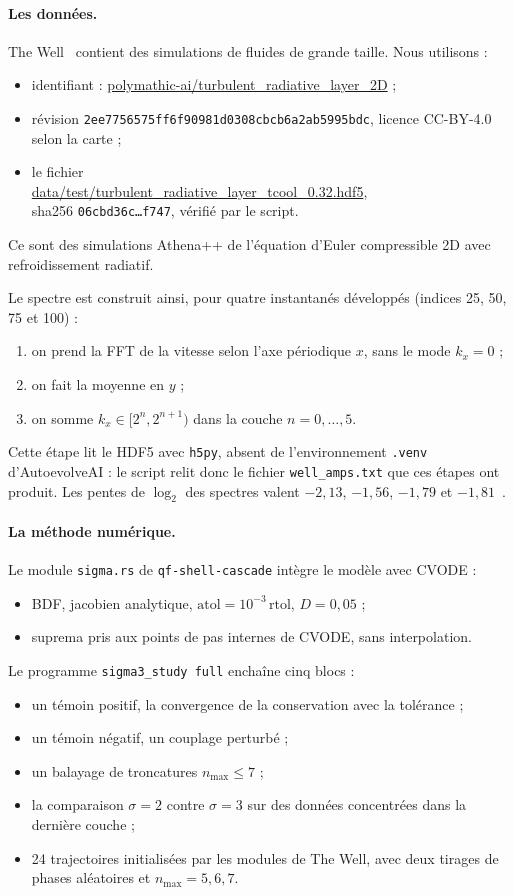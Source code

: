 \paragraph{Les données.} The Well~\cite{ch5:thewell} contient des simulations de fluides de grande taille. Nous
utilisons :
\begin{itemize}
\item identifiant : \url{polymathic-ai/turbulent_radiative_layer_2D} ;
\item révision \texttt{2ee7756575ff6f90981d0308cbcb6a2ab5995bdc}, licence CC-BY-4.0 selon la carte ;
\item le fichier\\ \url{data/test/turbulent_radiative_layer_tcool_0.32.hdf5},\\ sha256 \texttt{06cbd36c\dots f747},
vérifié par le script.
\end{itemize}
Ce sont des simulations Athena++ de l'équation d'Euler compressible 2D avec refroidissement radiatif.

Le spectre est construit ainsi, pour quatre instantanés développés (indices 25, 50, 75 et 100) :
\begin{enumerate}
\item on prend la FFT de la vitesse selon l'axe périodique $x$, sans le mode $k_x=0$ ;
\item on fait la moyenne en $y$ ;
\item on somme $k_x\in[2^n,2^{n+1})$ dans la couche $n=0,\dots,5$.
\end{enumerate}
Cette étape lit le HDF5 avec \texttt{h5py}, absent de l'environnement \texttt{.venv} d'AutoevolveAI : le script
relit donc le fichier \texttt{well\_amps.txt} que ces étapes ont produit. Les pentes de $\log_2$ des spectres valent
$-2{,}13$, $-1{,}56$, $-1{,}79$ et $-1{,}81$~\cite{ch5:sigma3}.

\paragraph{La méthode numérique.} Le module \texttt{sigma.rs} de \texttt{qf-shell-cascade} intègre le modèle avec CVODE :
\begin{itemize}
\item BDF, jacobien analytique, $\mathrm{atol}=10^{-3}\,\mathrm{rtol}$, $D=0{,}05$ ;
\item suprema pris aux points de pas internes de CVODE, sans interpolation.
\end{itemize}
Le programme \texttt{sigma3\_study full} enchaîne cinq blocs :
\begin{itemize}
\item un témoin positif, la convergence de la conservation avec la tolérance ;
\item un témoin négatif, un couplage perturbé ;
\item un balayage de troncatures $n_{\max}\le7$ ;
\item la comparaison $\sigma=2$ contre $\sigma=3$ sur des données concentrées dans la dernière couche ;
\item 24 trajectoires initialisées par les modules de The Well, avec deux tirages de phases aléatoires et
$n_{\max}=5,6,7$.
\end{itemize}

